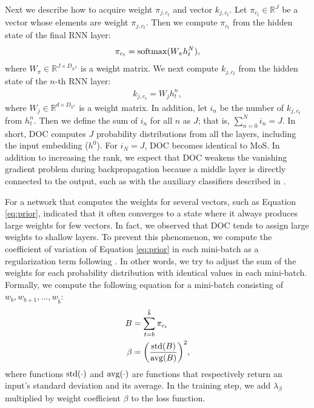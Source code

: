\documentclass[11pt,a4paper]{article}
\begin{document}
Next we describe how to acquire weight $\pi_{j, c_t}$ and vector $k_{j, c_t}$.
Let $\pi_{c_t} \in \mathbb{R}^{J}$ be a vector whose elements are weight $\pi_{j, c_t}$.
Then we compute $\pi_{c_t}$ from the hidden state of the final RNN layer:
\begin{align}
  \pi_{c_t} = {\rm softmax}(W_{\pi} h^{N}_{t} ), \label{eq:prior}
\end{align}
where $W_{\pi} \in \mathbb{R}^{J \times D_{h^N}}$ is a weight matrix.
We next compute $k_{j, c_t}$ from the hidden state of the $n$-th RNN layer:
\begin{align}
  k_{j, c_t} = W_j h^{n}_t,
\end{align}
where $W_j \in \mathbb{R}^{d \times D_{h^n}}$ is a weight matrix.
In addition, let $i_n$ be the number of $k_{j, c_t}$ from $h^{n}_t$.
Then we define the sum of $i_n$ for all $n$ as $J$; that is, $\sum_{n=0}^N i_n = J$.
In short, DOC computes $J$ probability distributions from all the layers, including the input embedding ($h^0$).
For $i_N = J$, DOC becomes identical to MoS.
In addition to increasing the rank, we expect that DOC weakens the vanishing gradient problem during backpropagation because a middle layer is directly connected to the output, such as with the auxiliary classifiers described in .



For a network that computes the weights for several vectors, such as Equation \ref{eq:prior},  indicated that it often converges to a state where it always produces large weights for few vectors.
In fact, we observed that DOC tends to assign large weights to shallow layers.
To prevent this phenomenon, we compute the coefficient of variation of Equation \ref{eq:prior} in each mini-batch as a regularization term following .
In other words, we try to adjust the sum of the weights for each probability distribution with identical values in each mini-batch.
Formally, we compute the following equation for a mini-batch consisting of $w_{b}, w_{b+1}, ..., w_{\tilde{b}}$:
\begin{align}
  B &= \sum_{t=b}^{\tilde{b}} \pi_{c_{t}} \\
  \beta &= \biggl(\frac{{\rm std}(B)} {{\rm avg}(B)} \biggr)^2, \label{eq:cv}
\end{align}
where functions ${\rm std}(\cdot)$ and ${\rm avg}(\cdot)$ are functions that respectively return an input's standard deviation and its average.
In the training step, we add $\lambda_{\beta}$ multiplied by weight coefficient $\beta$ to the loss function.
\end{document}
